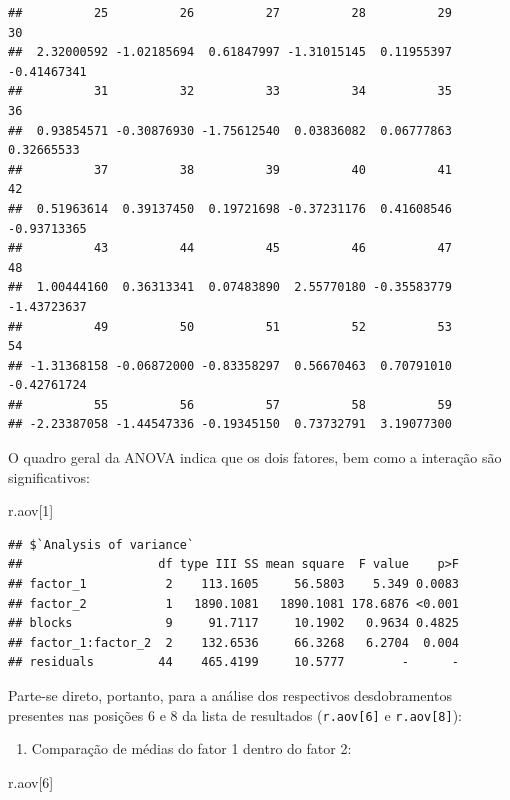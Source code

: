 \documentclass[
]{article}
\newenvironment{Shaded}{\begin{snugshade}}{\end{snugshade}}
\newcommand{\DecValTok}[1]{\textcolor[rgb]{0.00,0.00,0.81}{#1}}
\newcommand{\NormalTok}[1]{#1}
\providecommand{\tightlist}{%
  \setlength{\itemsep}{0pt}\setlength{\parskip}{0pt}}
\begin{document}
\begin{verbatim}
##          25          26          27          28          29          30 
##  2.32000592 -1.02185694  0.61847997 -1.31015145  0.11955397 -0.41467341 
##          31          32          33          34          35          36 
##  0.93854571 -0.30876930 -1.75612540  0.03836082  0.06777863  0.32665533 
##          37          38          39          40          41          42 
##  0.51963614  0.39137450  0.19721698 -0.37231176  0.41608546 -0.93713365 
##          43          44          45          46          47          48 
##  1.00444160  0.36313341  0.07483890  2.55770180 -0.35583779 -1.43723637 
##          49          50          51          52          53          54 
## -1.31368158 -0.06872000 -0.83358297  0.56670463  0.70791010 -0.42761724 
##          55          56          57          58          59 
## -2.23387058 -1.44547336 -0.19345150  0.73732791  3.19077300
\end{verbatim}

O quadro geral da ANOVA indica que os dois fatores, bem como a interação são significativos:

\begin{Shaded}
\begin{Highlighting}[]
\NormalTok{r.aov[}\DecValTok{1}\NormalTok{]}
\end{Highlighting}
\end{Shaded}

\begin{verbatim}
## $`Analysis of variance`
##                   df type III SS mean square  F value    p>F
## factor_1           2    113.1605     56.5803    5.349 0.0083
## factor_2           1   1890.1081   1890.1081 178.6876 <0.001
## blocks             9     91.7117     10.1902   0.9634 0.4825
## factor_1:factor_2  2    132.6536     66.3268   6.2704  0.004
## residuals         44    465.4199     10.5777        -      -
\end{verbatim}

Parte-se direto, portanto, para a análise dos respectivos desdobramentos presentes nas posições 6 e 8 da lista de resultados (\texttt{r.aov{[}6{]}} e \texttt{r.aov{[}8{]}}):

\begin{enumerate}
\def\labelenumi{\arabic{enumi}.}
\tightlist
\item
  Comparação de médias do fator 1 dentro do fator 2:
\end{enumerate}

\begin{Shaded}
\begin{Highlighting}[]
\NormalTok{r.aov[}\DecValTok{6}\NormalTok{]}
\end{Highlighting}
\end{Shaded}
\end{document}
